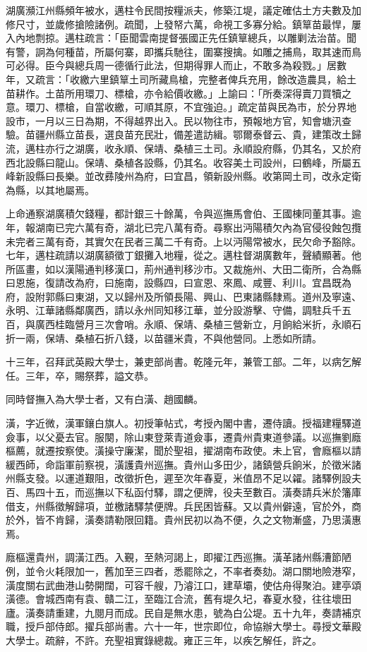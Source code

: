 \begin{pinyinscope}
湖廣瀕江州縣頻年被水，邁柱令民間按糧派夫，修築江堤，議定確估土方夫數及加修尺寸，並歲修搶險諸例。疏聞，上發帑六萬，命視工多寡分給。鎮筸苗最悍，屢入內地剽掠。邁柱疏言：「臣聞雲南提督張國正先任鎮筸總兵，以雕剿法治苗。聞有警，詗為何種苗，所屬何寨，即攜兵馳往，圍寨搜擒。如雕之捕鳥，取其速而鳥可必得。臣今與總兵周一德循行此法，但期得罪人而止，不敢多為殺戮。」居數年，又疏言：「收繳六里鎮筸土司所藏鳥槍，完整者俾兵充用，餘改造農具，給土苗耕作。土苗所用環刀、標槍，亦令給價收繳。」上諭曰：「所奏深得賣刀買犢之意。環刀、標槍，自當收繳，可順其原，不宜強迫。」疏定苗與民為市，於分界地設市，一月以三日為期，不得越界出入。民以物往市，預報地方官，知會塘汛查驗。苗疆州縣立苗長，選良苗充民壯，備差遣訪緝。鄂爾泰督云、貴，建策改土歸流，邁柱亦行之湖廣，收永順、保靖、桑植三土司。永順設府縣，仍其名，又於府西北設縣曰龍山。保靖、桑植各設縣，仍其名。收容美土司設州，曰鶴峰，所屬五峰新設縣曰長樂。並改彞陵州為府，曰宜昌，領新設州縣。收第岡土司，改永定衛為縣，以其地屬焉。

上命通察湖廣積欠錢糧，都計銀三十餘萬，令與巡撫馬會伯、王國棟同董其事。逾年，報湖南已完六萬有奇，湖北已完八萬有奇。尋察出沔陽積欠內為官侵役蝕包攬未完者三萬有奇，其實欠在民者三萬二千有奇。上以沔陽常被水，民欠命予豁除。七年，邁柱疏請以湖廣額徵丁銀攤入地糧，從之。邁柱督湖廣數年，聲績顯著。他所區畫，如以漢陽通判移漢口，荊州通判移沙市。又裁施州、大田二衛所，合為縣曰恩施，復請改為府，曰施南，設縣四，曰宣恩、來鳳、咸豐、利川。宜昌既為府，設附郭縣曰東湖，又以歸州及所領長陽、興山、巴東諸縣隸焉。道州及寧遠、永明、江華諸縣鄰廣西，請以永州同知移江華，並分設游擊、守備，調駐兵千五百，與廣西桂臨營月三次會哨。永順、保靖、桑植三營新立，月餉給米折，永順石折一兩，保靖、桑植石折八錢，以苗疆米貴，不與他營同。上悉如所請。

十三年，召拜武英殿大學士，兼吏部尚書。乾隆元年，兼管工部。二年，以病乞解任。三年，卒，賜祭葬，謚文恭。

同時督撫入為大學士者，又有白潢、趙國麟。

潢，字近微，漢軍鑲白旗人。初授筆帖式，考授內閣中書，遷侍讀。授福建糧驛道僉事，以父憂去官。服闋，除山東登萊青道僉事，遷貴州貴東道參議。以巡撫劉廕樞薦，就遷按察使。潢操守廉潔，聞於聖祖，擢湖南布政使。未上官，會廕樞以請緩西師，命詣軍前察視，潢護貴州巡撫。貴州山多田少，諸鎮營兵餉米，於徵米諸州縣支發。以運道艱阻，改徵折色，遲至次年春夏，米值昂不足以糴。諸驛例設夫百、馬四十五，而巡撫以下私函付驛，謂之便牌，役夫至數百。潢奏請兵米於籓庫借支，州縣徵解歸項，並檄諸驛禁便牌。兵民困皆蘇。又以貴州僻遠，官於外，商於外，皆不肯歸，潢奏請勒限回籍。貴州民初以為不便，久之文物漸盛，乃思潢惠焉。

廕樞還貴州，調潢江西。入覲，至熱河謁上，即擢江西巡撫。潢革諸州縣漕節陋例，並令火耗限加一，舊加至三四者，悉罷除之，不率者奏劾。湖口關地險港窄，潢度關右武曲港山勢開闊，可容千艘，乃濬江口，建草壩，使估舟得聚泊。建亭頌潢德。會城西南有袁、贛二江，至臨江合流，舊有堤久圮，春夏水發，往往壞田廬。潢奏請重建，九閱月而成。民自是無水患，號為白公堤。五十九年，奏請補京職，授戶部侍郎。擢兵部尚書。六十一年，世宗即位，命協辦大學士。尋授文華殿大學士。疏辭，不許。充聖祖實錄總裁。雍正三年，以疾乞解任，許之。


\end{pinyinscope}
